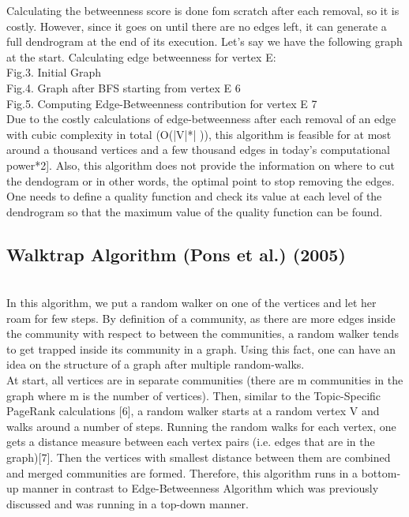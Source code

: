 \documentclass[10pt]{article}
\begin{document}
Calculating the betweenness score is done fom scratch after each removal, so it is costly. However, since it goes on until there are no edges left, it can generate a full dendrogram at the end of its execution. Let’s say we have the following graph at the start. Calculating edge betweenness for vertex E: \\

Fig.3. Initial Graph \\

Fig.4. Graph after BFS starting from vertex E 6 \\
  
Fig.5. Computing Edge-Betweenness contribution for vertex E 7 \\

Due to the costly calculations of edge-betweenness after each removal of an edge with cubic complexity in total (O(|V|*| )), this algorithm is feasible for at most around a thousand vertices and a few thousand edges in today’s computational power*2]. Also, this algorithm does not provide the information on where to cut the dendogram or in other words, the optimal point to stop removing the edges. One needs to define a quality function and check its value at each level of the dendrogram so that the maximum value of the quality function can be found. \\

\subsection{Walktrap Algorithm (Pons et al.) (2005)} \\

In this algorithm, we put a random walker on one of the vertices and let her roam for few steps. By definition of a community, as there are more edges inside the community with respect to between the communities, a random walker tends to get trapped inside its community in a graph. Using this fact, one can have an idea on the structure of a graph after multiple random-walks. \\

At start, all vertices are in separate communities (there are m communities in the graph where m is the number of vertices). Then, similar to the Topic-Specific PageRank calculations [6], a random walker starts at a random vertex V and walks around a number of steps. Running the random walks for each vertex, one gets a distance measure between each vertex pairs (i.e. edges that are in the graph)[7]. Then the vertices with smallest distance between them are combined and merged communities are formed. Therefore, this algorithm runs in a bottom-up manner in contrast to Edge-Betweenness Algorithm which was previously discussed and was running in a top-down manner. \\
\end{document}
